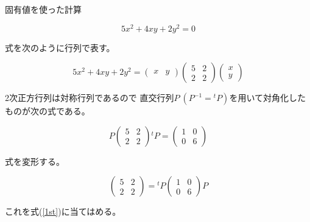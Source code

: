 \documentclass[12pt,b5paper]{ltjsarticle}
\begin{document}
固有値を使った計算

\hrulefill

\begin{equation}
 5x^2 + 4xy + 2y^2 =0
\end{equation}


\hrulefill

式を次のように行列で表す。

\begin{equation}
 5x^2 + 4xy + 2y^2 =
  \begin{pmatrix}
   x & y
  \end{pmatrix}
  \begin{pmatrix}
   5 & 2\\ 2 & 2
  \end{pmatrix}
  \begin{pmatrix}
   x \\ y
  \end{pmatrix}
  \label{1st}
\end{equation}

2次正方行列は対称行列であるので
直交行列$P\ (P^{-1}={}^{t}\!P)$を用いて対角化したものが次の式である。

\begin{equation}
 P
 \begin{pmatrix}
   5 & 2\\ 2 & 2
 \end{pmatrix}
 {}^{t}\!P
 =
 \begin{pmatrix}
   1 & 0\\ 0 & 6
 \end{pmatrix}
\end{equation}

式を変形する。

\begin{equation}
 \begin{pmatrix}
   5 & 2\\ 2 & 2
 \end{pmatrix}
 =
 {}^{t}\!P
 \begin{pmatrix}
   1 & 0\\ 0 & 6
 \end{pmatrix}
 P
\end{equation}

これを式(\ref{1st})に当てはめる。
\end{document}

